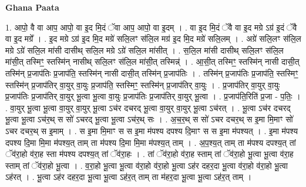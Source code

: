 \documentclass[17pt]{extarticle}
\begin{document}
\textbf{Ghana Paata } \newline

1. आपो॒ वै वा आप॒ आपो॒ वा इ॒द मि॒दं ॅवा आप॒ आपो॒ वा इ॒दम् । . वा इ॒द मि॒दं ॅवै वा इ॒द मग्रे ऽग्र॑ इ॒दं ॅवै वा इ॒द मग्रे᳚ । . इ॒द मग्रे ऽग्र॑ इ॒द मि॒द मग्रे॑ सलि॒लꣳ स॑लि॒ल मग्र॑ इ॒द मि॒द मग्रे॑ सलि॒लम् । . अग्रे॑ सलि॒लꣳ स॑लि॒ल मग्रे ऽग्रे॑ सलि॒ल मा॑सी दासीथ् सलि॒ल मग्रे ऽग्रे॑ सलि॒ल मा॑सीत् । . स॒लि॒ल मा॑सी दासीथ् सलि॒लꣳ स॑लि॒ल मा॑सी॒त् तस्मिꣳ॒॒ स्तस्मि॑न् नासीथ् सलि॒लꣳ स॑लि॒ल मा॑सी॒त् तस्मिन्न्॑ । . आ॒सी॒त् तस्मिꣳ॒॒ स्तस्मि॑न् नासी दासी॒त् तस्मि॑न् प्र॒जाप॑तिः प्र॒जाप॑ति॒ स्तस्मि॑न् नासी दासी॒त् तस्मि॑न् प्र॒जाप॑तिः । . तस्मि॑न् प्र॒जाप॑तिः प्र॒जाप॑ति॒ स्तस्मिꣳ॒॒ स्तस्मि॑न् प्र॒जाप॑तिर् वा॒युर् वा॒युः प्र॒जाप॑ति॒ स्तस्मिꣳ॒॒ स्तस्मि॑न् प्र॒जाप॑तिर् वा॒युः । . प्र॒जाप॑तिर् वा॒युर् वा॒युः प्र॒जाप॑तिः प्र॒जाप॑तिर् वा॒युर् भू॒त्वा भू॒त्वा वा॒युः प्र॒जाप॑तिः प्र॒जाप॑तिर् वा॒युर् भू॒त्वा । . प्र॒जाप॑ति॒रिति॑ प्र॒जा - प॒तिः॒ । . वा॒युर् भू॒त्वा भू॒त्वा वा॒युर् वा॒युर् भू॒त्वा ऽच॑र दचरद् भू॒त्वा वा॒युर् वा॒युर् भू॒त्वा ऽच॑रत् । . भू॒त्वा ऽच॑र दचरद् भू॒त्वा भू॒त्वा ऽच॑र॒थ् स सो॑ ऽचरद् भू॒त्वा भू॒त्वा ऽच॑र॒थ् सः । . अ॒च॒र॒थ् स सो॑ ऽचर दचर॒थ् स इ॒मा मि॒माꣳ सो॑ ऽचर दचर॒थ् स इ॒माम् । . स इ॒मा मि॒माꣳ स स इ॒मा म॑पश्य दपश्य दि॒माꣳ स स इ॒मा म॑पश्यत् । . इ॒मा म॑पश्य दपश्य दि॒मा मि॒मा म॑पश्य॒त् ताम् ता म॑पश्य दि॒मा मि॒मा म॑पश्य॒त् ताम् । . अ॒प॒श्य॒त् ताम् ता म॑पश्य दपश्य॒त् तां ॅव॑रा॒हो व॑रा॒ह स्ता म॑पश्य दपश्य॒त् तां ॅव॑रा॒हः । . तां ॅव॑रा॒हो व॑रा॒ह स्ताम् तां ॅव॑रा॒हो भू॒त्वा भू॒त्वा व॑रा॒ह स्ताम् तां ॅव॑रा॒हो भू॒त्वा । . व॒रा॒हो भू॒त्वा भू॒त्वा व॑रा॒हो व॑रा॒हो भू॒त्वा ऽह॑र दहर॒दा भू॒त्वा व॑रा॒हो व॑रा॒हो भू॒त्वा ऽह॑रत् । . भू॒त्वा ऽह॑र दहर॒दा भू॒त्वा भू॒त्वा ऽह॑र॒त् ताम् ता म॑हर॒दा भू॒त्वा भू॒त्वा ऽह॑र॒त् ताम् । \newline
\end{document}
